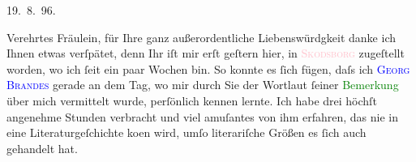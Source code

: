 \pstart
           \raggedleft{}19. 8. 96.\pend
           
\pstart{}Verehrtes Fräulein,\pend\vspace{0.5em}
\pstart
           für Ihre ganz außerordentliche Liebenswürdgkeit danke ich Ihnen etwas verſpätet, denn
               Ihr \label{K_L04328-1v}\label{K_L04328-1} iſt mir erſt geſtern hier,
               in \textcolor{pink}{\textsc{Skodsborg}}\ledrightnote{\textcolor{pink}{Skodsborg}} zugeſtellt worden, wo ich ſeit ein paar Wochen bin. So konnte es ſich fügen, daſs ich \textcolor{blue}{\textsc{Georg Brandes}}\ledrightnote{\textcolor{blue}{Georg Brandes}} gerade an dem Tag, wo mir durch Sie {\pb}der Wortlaut ſeiner \textcolor{green}{Bemerkung}\ledrightnote{{$\rightarrow$}\emph{\textcolor{green}{To Forestillinger af Henrik IV}}} über mich vermittelt
               wurde, perſönlich kennen lernte. Ich habe \label{K_L04328-2v}\label{K_L04328-2} drei
               höchſt angenehme Stunden verbracht und viel amuſantes von ihm erfahren, das nie in
               eine Literaturgeſchichte ko{\geminationm}en wird, umſo literariſche
               Größen es ſich auch gehandelt hat.\pend
           

